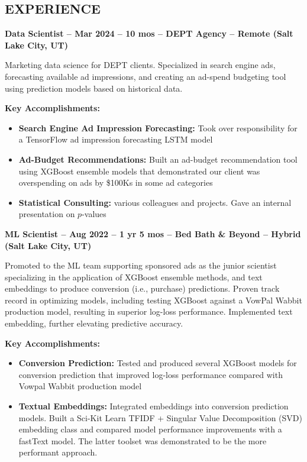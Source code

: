 \documentclass[resmargin, centered, 10pt]{res}
\def \subwidth{13.5cm}
\newcommand{\tab}[1][1cm]{\hspace*{#1}}
\newcommand{\subtext}[1]{\tab[0.5cm] \parbox{\subwidth{}}{#1}}
\begin{document}
\begin{resume}
\section{EXPERIENCE}

\textbf{Data Scientist -- Mar 2024 -- 10 mos -- DEPT Agency -- Remote (Salt Lake City, UT)}

\subtext{Marketing data science for DEPT clients. Specialized in search engine ads, forecasting available ad impressions, and creating an ad-spend budgeting tool using prediction models based on historical data.}

\subtext{\textbf{Key Accomplishments:}}

\begin{itemize}
	\item \textbf{Search Engine Ad Impression Forecasting:} Took over responsibility for a TensorFlow ad impression forecasting LSTM model
	\item \textbf{Ad-Budget Recommendations:} Built an ad-budget recommendation tool using XGBoost ensemble models that demonstrated our client was overspending on ads by \$100Ks in some ad categories
	\item \textbf{Statistical Consulting:} various colleagues and projects. Gave an internal presentation on $p$-values
\end{itemize}

\textbf{ML Scientist -- Aug 2022 -- 1 yr 5 mos -- Bed Bath \& Beyond -- Hybrid (Salt Lake City, UT)}

\subtext{Promoted to the ML team supporting sponsored ads as the junior scientist specializing in the application of XGBoost ensemble methods, and text embeddings to produce conversion (i.e., purchase) predictions. Proven track record in optimizing models, including testing XGBoost against a VowPal Wabbit production model, resulting in superior log-loss performance. Implemented text embedding, further elevating predictive accuracy.}

\subtext{\textbf{Key Accomplishments:}}

\begin{itemize}
	\item \textbf{Conversion Prediction:} Tested and produced several XGBoost models for conversion prediction that improved log-loss performance compared with Vowpal Wabbit production model
	\item \textbf{Textual Embeddings:} Integrated embeddings into conversion prediction models. Built a Sci-Kit Learn TFIDF + Singular Value Decomposition (SVD) embedding class and compared model performance improvements with a fastText model. The latter toolset was demonstrated to be the more performant approach.
\end{itemize}


\end{resume}
\end{document}
